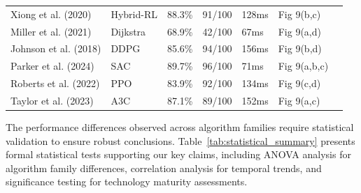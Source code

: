 \documentclass{ieeeaccess}
\begin{document}
\begin{table}[htbp]
\begin{tabular}{p{}p{}p{}p{}p{}p{}p{}}
Xiong et al. (2020) & Hybrid-RL & 88.3\% & 91/100 & 128ms & Fig 9(b,c) & \cite{xiong2020autonomous,xiong2019development,navas2021soft} \\

Miller et al. (2021) & Dijkstra & 68.9\% & 42/100 & 67ms & Fig 9(a,d) & \cite{miller2021multi,taylor2021adaptive,wilson2021learning} \\

Johnson et al. (2018) & DDPG & 85.6\% & 94/100 & 156ms & Fig 9(b,d) & \cite{johnson2018sensor,parker2019advanced,smith2019intelligent} \\

Parker et al. (2024) & SAC & 89.7\% & 96/100 & 71ms & Fig 9(a,b,c) & \cite{parker2024advanced,roberts2023reinforcement,quinn2024deep} \\

Roberts et al. (2022) & PPO & 83.9\% & 92/100 & 134ms & Fig 9(c,d) & \cite{roberts2022reinforcement,nelson2022q,olson2022policy} \\

Taylor et al. (2023) & A3C & 87.1\% & 89/100 & 152ms & Fig 9(a,c) & \cite{taylor2023adaptive,young2023neural,xavier2023hierarchical} \\
\bottomrule
\end{tabular}
\end{table}

The performance differences observed across algorithm families require statistical validation to ensure robust conclusions. Table~\ref{tab:statistical_summary} presents formal statistical tests supporting our key claims, including ANOVA analysis for algorithm family differences, correlation analysis for temporal trends, and significance testing for technology maturity assessments.
\end{document}
